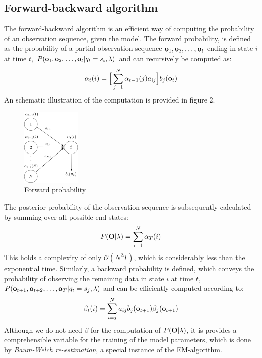 \documentclass[conference]{IEEEtran}
\begin{document}
\subsection{Forward-backward algorithm}
The forward-backward algorithm is an efficient way of computing the probability of an observation sequence, given the model. The forward probability, is defined as the probability of a partial observation sequence ${\bf o}_1, {\bf o}_2, \ldots, {\bf o}_t$ ending in state $i$ at time $t$, $P({\bf o}_{1},{\bf o}_{2},\ldots, {\bf o}_{t}| q_{t} = s_{i}, \lambda)$ and can recursively be computed as:
\begin{equation}
 \label{forwardProbability}
 \alpha_{t}(i) = \displaystyle \Big [ \sum_{j=1}^{N}  \alpha_{t-1}(j) a_{ij} \Big ] b_{j}({\bf o}_{t})
\end{equation}
An schematic illustration of the computation is provided in figure 2.
\begin{figure}[H]
\centering
\includegraphics[width=0.25\textwidth]{forward2.jpg}
 \caption{Forward probability}
\end{figure}
The posterior probability of the observation sequence is subsequently calculated by summing over all possible end-states:
\begin{equation}
 P({\bf O}|\lambda) = \displaystyle \sum_{i = 1}^{N} \alpha_{T}(i)
\end{equation}
This holds a complexity of only $\mathcal{O}(N^{2}T)$, which is considerably less than the exponential time. Similarly, a backward probability is defined, which conveys the probability of observing the remaining data in state $i$ at time $t$, $P({\bf o}_{t+1},{\bf o}_{t+2},\ldots, {\bf o}_{T}| q_{t} = s_{j}, \lambda)$ and can be efficiently computed according to:
\begin{equation}
 \label{backwardProbability}
\beta_{t}(i) = \displaystyle \sum_{i=j}^{N} a_{ij} b_{j}({\bf o}_{t+1}) \beta_{j}({\bf o}_{t+1})
\end{equation}
Although we do not need $\beta$ for the computation of $P({\bf O}|\lambda)$, it is provides a comprehensible variable for the training of the model parameters, which  is done by {\it Baum-Welch re-estimation}, a special instance of the EM-algorithm.
\end{document}
